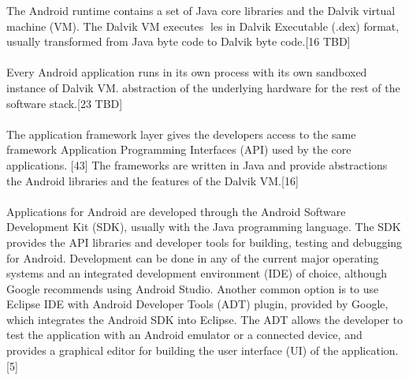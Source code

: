 The Android runtime contains a set of Java core libraries and the Dalvik
virtual machine (VM). The Dalvik VM executes les in Dalvik Executable
(.dex) format, usually transformed from Java byte code to Dalvik byte code.[16 TBD] %

\paragraph{}
Every Android application runs in its own process with its own sandboxed instance of Dalvik VM.
abstraction of the underlying hardware for the rest of the software stack.[23 TBD]

\paragraph{}
The application framework layer gives the developers access to the same framework Application Programming Interfaces (API) used by the core applications.
[43] The frameworks are written in Java and provide abstractions the Android libraries and the features of the Dalvik VM.[16]


\paragraph{}
Applications for Android are developed through the Android Software
Development Kit (SDK), usually with the Java programming language. The
SDK provides the API libraries and developer tools for building, testing and
debugging for Android. Development can be done in any of the current major
operating systems and an integrated development environment (IDE) of
choice, although Google recommends using Android Studio. Another common
option is to use Eclipse IDE with Android Developer Tools (ADT) plugin,
provided by Google, which integrates the Android SDK into Eclipse. The
ADT allows the developer to test the application with an Android emulator
or a connected device, and provides a graphical editor for building the user
interface (UI) of the application.[5]

